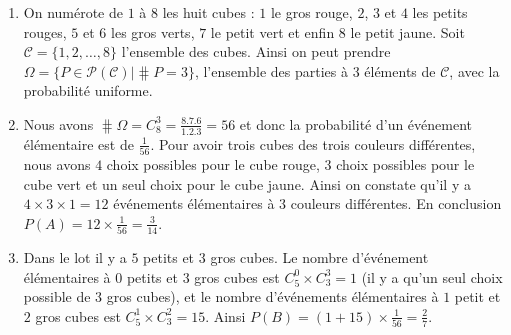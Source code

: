 \documentclass[a4paper,12pt,reqno]{amsart}
\begin{document}
\begin{solution}
  \begin{enumerate}
    \item On numérote de $1$ à $8$ les huit cubes : $1$ le gros rouge, $2$, $3$ et $4$ les petits rouges, $5$ et $6$ les gros verts, $7$ le petit vert et enfin $8$ le petit jaune. Soit $\mathcal{C}=\{1,2,\ldots,8\}$ l'ensemble des cubes. Ainsi on peut prendre $\Omega = \{P \in \mathcal{P}(\mathcal{C}) | \hash P = 3\}$, l'ensemble des parties à 3 éléments de $\mathcal{C}$, avec la probabilité uniforme.
    \item Nous avons $\hash \Omega = C^{3}_{8}=\frac{8.7.6}{1.2.3} = 56$ et donc la probabilité d'un événement élémentaire est de $\frac{1}{56}$. Pour avoir trois cubes des trois couleurs différentes, nous avons $4$ choix possibles pour le cube rouge, $3$ choix possibles pour le cube vert et un seul choix pour le cube jaune. Ainsi on constate qu'il y a $4 \times 3 \times 1 = 12$ événements élémentaires à $3$ couleurs différentes. En conclusion $P(A)=12 \times \frac{1}{56}=\frac{3}{14}$.
    \item Dans le lot il y a $5$ petits et $3$ gros cubes. Le nombre d'événement élémentaires à $0$ petits et $3$ gros cubes est $C^{0}_{5} \times C^{3}_{3}=1$ (il y a qu'un seul choix possible de 3 gros cubes), et le nombre d'événements élémentaires à $1$ petit et $2$ gros cubes est $C^{1}_{5} \times C^{2}_{3} = 15$. Ainsi $P(B) = (1+15) \times \frac{1}{56} = \frac{2}{7}$.
  \end{enumerate}

\end{solution}
\end{document}
